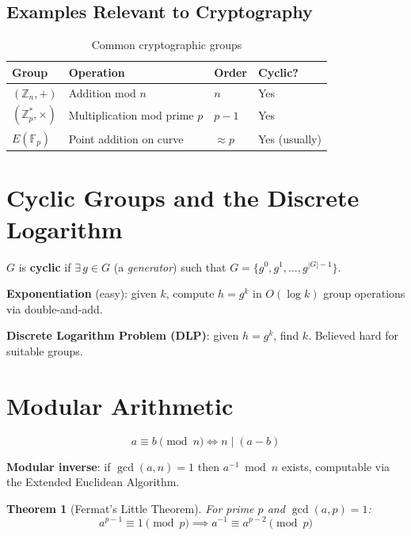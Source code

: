 \documentclass[12pt,a4paper,openany]{book}
\theoremstyle{definition}
\theoremstyle{plain}
\newtheorem{theorem}{Theorem}[chapter]
\theoremstyle{remark}
\begin{document}
\subsection{Examples Relevant to Cryptography}

\begin{table}[h]
\centering
\caption{Common cryptographic groups}
\begin{tabular}{llll}
\toprule
\textbf{Group} & \textbf{Operation} & \textbf{Order} & \textbf{Cyclic?}\\
\midrule
$(\mathbb{Z}_n,+)$ & Addition mod $n$ & $n$ & Yes \\
$(\mathbb{Z}_p^*,\times)$ & Multiplication mod prime $p$ & $p-1$ & Yes \\
$E(\mathbb{F}_p)$ & Point addition on curve & $\approx p$ & Yes (usually) \\
\bottomrule
\end{tabular}
\end{table}

\section{Cyclic Groups and the Discrete Logarithm}

\begin{definitionbox}
  $G$ is \textbf{cyclic} if $\exists\,g\in G$ (a \emph{generator}) such that
  $G=\{g^0,g^1,\ldots,g^{|G|-1}\}$.
\end{definitionbox}

\textbf{Exponentiation} (easy): given $k$, compute $h=g^k$ in
$O(\log k)$ group operations via double-and-add.

\textbf{Discrete Logarithm Problem (DLP)}: given $h=g^k$, find $k$.
Believed hard for suitable groups.

\section{Modular Arithmetic}

\[
a \equiv b\pmod n \iff n\mid(a-b)
\]

\textbf{Modular inverse}: if $\gcd(a,n)=1$ then $a^{-1}\bmod n$ exists,
computable via the Extended Euclidean Algorithm.

\begin{theorem}[Fermat's Little Theorem]
  For prime $p$ and $\gcd(a,p)=1$:
  \[
    \boxed{a^{p-1}\equiv 1\pmod p} \implies a^{-1}\equiv a^{p-2}\pmod p
  \]
\end{theorem}
\end{document}
